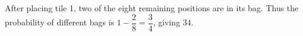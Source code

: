 After placing tile 1, two of the eight remaining positions are in its bag. Thus the probability of different bags is $1-\dfrac{2}{8}=\dfrac{3}{4}$, giving $\boxed{34}$.
